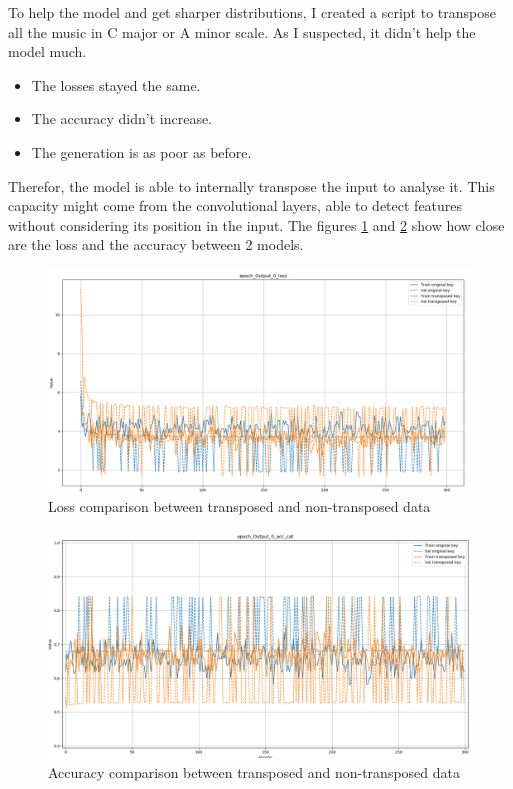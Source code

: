 \documentclass[12pt]{report}
\begin{document}
To help the model and get sharper distributions, I created a script to transpose all the music in C major or A minor scale.
As I suspected, it didn't help the model much.
\begin{itemize}
    \item The losses stayed the same.
    \item The accuracy didn't increase.
    \item The generation is as poor as before.
\end{itemize}
Therefor, the model is able to internally transpose the input to analyse it.
This capacity might come from the convolutional layers, able to detect features without considering its position in the input.
The figures \ref{fig:loss-comparison-transposed} and \ref{fig:acc-comparison-transposed} show how close are the loss and the accuracy between 2 models.

\begin{figure}[htbp]
    \centering
    \includegraphics[width=\textwidth]{images/experiences/transpose/loss-comparison-transpose.png}
    \caption{Loss comparison between transposed and non-transposed data}
    \label{fig:loss-comparison-transposed}
\end{figure}
\begin{figure}[htbp]
    \centering
    \includegraphics[width=\textwidth]{images/experiences/transpose/acc-comparison-transpose.png}
    \caption{Accuracy comparison between transposed and non-transposed data}
    \label{fig:acc-comparison-transposed}
\end{figure}
\end{document}
